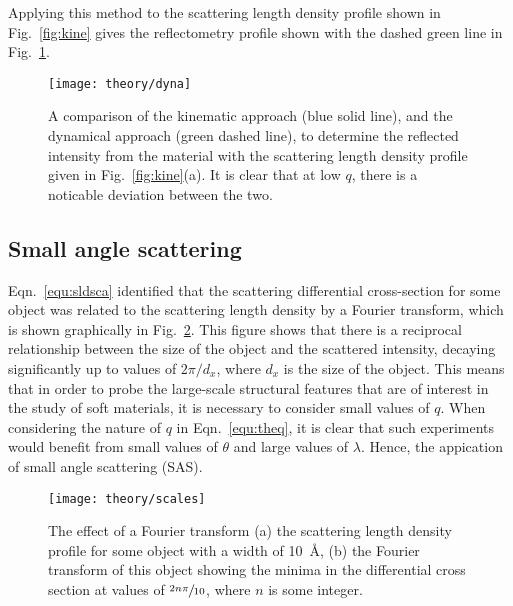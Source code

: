 Applying this method to the scattering length density profile shown in Fig.~\ref{fig:kine} gives the reflectometry profile shown with the dashed green line in Fig.~\ref{fig:dyna}.
%
\begin{figure}
	\centering
	\begin{minipage}{0.915\textwidth}
		
	\end{minipage}
\end{figure}
%
%
\begin{figure}
	\centering
	\texttt{[image: theory/dyna]}
	\caption{A comparison of the kinematic approach (blue solid line), and the dynamical approach (green dashed line), to determine the reflected intensity from the material with the scattering length density profile given in Fig.~\ref{fig:kine}(a). It is clear that at low $q$, there is a noticable deviation between the two.}
	\label{fig:dyna}
\end{figure}
%


\subsection{Small angle scattering}

Eqn.~\ref{equ:sldsca} identified that the scattering differential cross-section for some object was related to the scattering length density by a Fourier transform, which is shown graphically in Fig.~\ref{fig:scales}.
This figure shows that there is a reciprocal relationship between the size of the object and the scattered intensity, decaying significantly up to values of $2\pi/d_x$, where $d_x$ is the size of the object.
This means that in order to probe the large-scale structural features that are of interest in the study of soft materials, it is necessary to consider small values of $q$.
When considering the nature of $q$ in Eqn.~\ref{equ:theq}, it is clear that such experiments would benefit from small values of $\theta$ and large values of $\lambda$.
Hence, the appication of small angle scattering (SAS).
%
\begin{figure}
	\centering
	\texttt{[image: theory/scales]}
	\caption{The effect of a Fourier transform (a) the scattering length density profile for some object with a width of \SI{10}{\angstrom}, (b) the Fourier transform of this object showing the minima in the differential cross section at values of $\sfrac{2n\pi}{10}$, where $n$ is some integer.}
	\label{fig:scales}
\end{figure}
%

